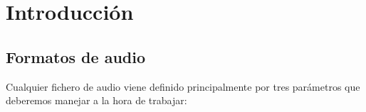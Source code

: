 \documentclass[es,practica]{uah}
\begin{document}

\maketitle

\section{Introducción}

\subsection{Formatos de audio}

Cualquier fichero de audio viene definido principalmente por tres parámetros que deberemos manejar a la hora de trabajar:
\end{document}

